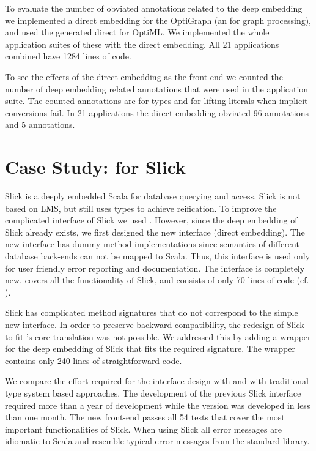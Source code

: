 To evaluate the number of obviated annotations related to the deep embedding we
implemented a direct embedding for the OptiGraph \edsl (an \edsl for graph
processing), and used the generated direct \edsl for OptiML. We implemented
the whole application suites of these \edsls with the direct embedding. All 21
applications combined have 1284 lines of code.

To see the effects of the direct embedding as the front-end we counted the
number of deep embedding related annotations that were used in the application
suite. The counted annotations are  for types and 
for lifting literals when implicit conversions fail. In 21 applications
the direct embedding obviated 96  annotations and 5
 annotations.

\section{Case Study: \yy for Slick}
\label{subsec:slick}
Slick is a deeply embedded Scala \edsl for database querying and access. Slick
is not based on LMS, but still uses  types to achieve reification.
To improve the complicated interface of Slick we used \yy.
However, since the deep embedding of Slick already exists, we first designed the new
interface (direct embedding). The new interface has dummy method
implementations since semantics of different database back-ends can not be
mapped to Scala. Thus, this interface is used only for user friendly error reporting and
documentation. The interface is completely new, covers all the functionality of Slick,
 and consists of only 70 lines of code (cf. \cite{techrep}).

Slick has complicated method signatures that do not correspond to the simple new
interface. In order to preserve backward compatibility, the redesign of Slick to
fit \yy's core translation was not possible. We addressed this by adding a
wrapper for the deep embedding of Slick that fits the required signature.
The wrapper contains only 240 lines of straightforward code.

We compare the effort required for the interface design with \yy and with
traditional type system based approaches. The development of the previous Slick
interface required more than a year of development while the \yy version was
developed in less than one month. The new front-end passes all 54 tests that cover the
most important functionalities of Slick. When using Slick all error messages are
idiomatic to Scala and resemble typical error messages from the standard
library.

